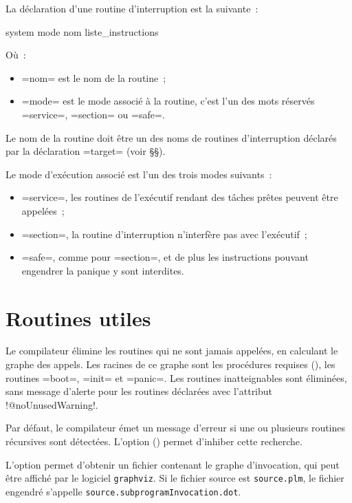 
La déclaration d'une routine d'interruption est la suivante~:
\begin{PLM}
system mode nom {
  liste_instructions
}
\end{PLM}
Où~:
\begin{itemize}
  \item \plm=nom= est le nom de la routine~;
  \item \plm=mode= est le mode associé à la routine, c'est l'un des mots réservés \plm=service=, \plm=section= ou \plm=safe=.
\end{itemize}

Le nom de la routine doit être un des noms de routines d'interruption déclarés par la déclaration \plm=target= (voir §§).

Le mode d'exécution associé est l'un des trois modes suivants~:
\begin{itemize}
  \item \plm=service=, les routines de l'exécutif rendant des tâches prêtes peuvent être appelées~;
  \item \plm=section=, la routine d'interruption n'interfère pas avec l'exécutif~;
  \item \plm=safe=, comme pour \plm=section=, et de plus les instructions pouvant engendrer la panique y sont interdites.
\end{itemize}









\section{Routines utiles}

Le compilateur élimine les routines qui ne sont jamais appelées, en calculant le graphe des appels. Les racines de ce graphe sont les procédures requises (), les routines \plm=boot=, \plm=init= et \plm=panic=. Les routines inatteignables sont éliminées, sans message d'alerte pour les routines déclarées avec l'attribut \plm!@noUnusedWarning!.












Par défaut, le compilateur émet un message d'erreur si une ou plusieurs routines récursives sont détectées. L'option  () permet d'inhiber cette recherche.

L'option  permet d'obtenir un fichier contenant le graphe d'invocation, qui peut être affiché par le logiciel \texttt{graphviz}. Si le fichier source est \texttt{source.plm}, le fichier engendré s'appelle \texttt{source.subprogramInvocation.dot}.

